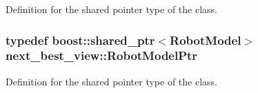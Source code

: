 \-Definition for the shared pointer type of the class. 

\hypertarget{namespacenext__best__view_ad248a43c564dbbea474aa87f0fb56b22}{
\subsubsection[{\-Robot\-Model\-Ptr}]{\setlength{\rightskip}{0pt plus 5cm}typedef boost\-::shared\-\_\-ptr$<${\bf \-Robot\-Model}$>$ {\bf next\-\_\-best\-\_\-view\-::\-Robot\-Model\-Ptr}}}\label{namespacenext__best__view_ad248a43c564dbbea474aa87f0fb56b22}


\-Definition for the shared pointer type of the class. 

